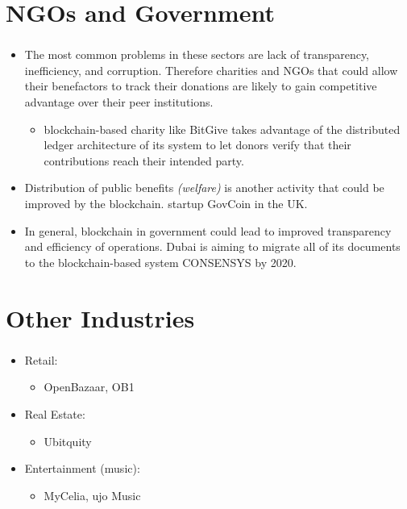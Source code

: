 \documentclass[ 10pt, xcolor = dvipsnames]{beamer}
\begin{document}
\section{NGOs and Government}
\begin{frame}[allowframebreaks]
\frametitle{\insertsection}

\begin{itemize}
\item The most common problems in these sectors are lack of transparency, inefficiency, and corruption. Therefore charities and NGOs that could allow their benefactors to track their donations are likely to gain competitive advantage over their peer institutions. 
\begin{itemize}
\item \Eg blockchain-based charity like BitGive takes advantage of the distributed ledger architecture of its system to let donors verify that their contributions reach their intended party. 
\end{itemize}
\item Distribution of public benefits \emph{(welfare)} is another activity that could be improved by the blockchain. \Eg startup GovCoin in the UK. 
\item In general, blockchain in government could lead to improved transparency and efficiency of operations. \Eg Dubai is aiming to migrate all of its documents to the blockchain-based system CONSENSYS by 2020. 
\end{itemize}

\end{frame}

\section{Other Industries}
\begin{frame}[allowframebreaks]
\frametitle{\insertsection}

\begin{itemize}
\item Retail: 
\begin{itemize}
\item OpenBazaar, OB1
\end{itemize}
\item Real Estate: 
\begin{itemize}
\item Ubitquity
\end{itemize}
\item Entertainment (music): 
\begin{itemize}
\item MyCelia, ujo Music
\end{itemize}
\end{itemize}

\end{frame}
\end{document}
